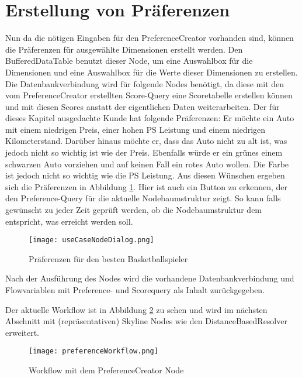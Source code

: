 \section{Erstellung von Präferenzen}
\label{ch:Evaluierung:sec:createPref}
Nun da die nötigen Eingaben für den PreferenceCreator vorhanden sind, können die Präferenzen für ausgewählte Dimensionen erstellt werden. Den BufferedDataTable benutzt dieser Node, um eine Auswahlbox für die Dimensionen und eine Auswahlbox für die Werte dieser Dimensionen zu erstellen. Die Datenbankverbindung wird für folgende Nodes benötigt, da diese mit den vom PreferenceCreator erstellten Score-Query eine Scoretabelle erstellen können und mit diesen Scores anstatt der eigentlichen Daten weiterarbeiten. 
Der für dieses Kapitel ausgedachte Kunde hat folgende Präferenzen: Er möchte ein Auto mit einem niedrigen Preis, einer hohen PS Leistung und einem niedrigen Kilometerstand. Darüber hinaus möchte er, dass das Auto nicht zu alt ist, was jedoch nicht so wichtig ist wie der Preis. Ebenfalls würde er ein grünes einem schwarzen Auto vorziehen und auf keinen Fall ein rotes Auto wollen. Die Farbe ist jedoch nicht so wichtig wie die PS Leistung. Aus diesen Wünschen ergeben sich die Präferenzen in Abbildung \ref{img:useCaseNodeDialog}. Hier ist auch ein Button zu erkennen, der den Preference-Query für die aktuelle Nodebaumstruktur zeigt. So kann falls gewünscht zu jeder Zeit geprüft werden, ob die Nodebaumstruktur dem entspricht, was erreicht werden soll. 

\begin{figure}[H]
	\centering
	\texttt{[image: useCaseNodeDialog.png]}
	\caption{Präferenzen für den besten Basketballspieler}
	\label{img:useCaseNodeDialog}
\end{figure} 

Nach der Ausführung des Nodes wird die vorhandene Datenbankverbindung und Flowvariablen mit Preference- und Scorequery als Inhalt zurückgegeben. 

Der aktuelle Workflow ist in Abbildung \ref{img:preferenceWorkflow} zu sehen und wird im nächsten Abschnitt mit (repräsentativen) Skyline Nodes wie den DistanceBasedResolver erweitert. 

\begin{figure}[H]
	\centering
	\texttt{[image: preferenceWorkflow.png]}
	\caption{Workflow mit dem PreferenceCreator Node}
	\label{img:preferenceWorkflow}
\end{figure}  
